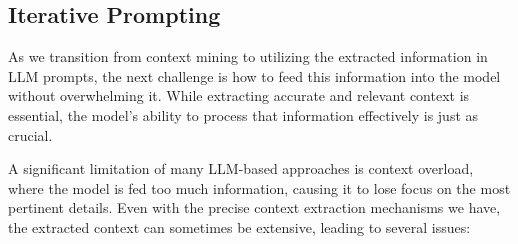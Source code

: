 \subsection{Iterative Prompting}\label{prompting_method}
As we transition from context mining to utilizing the extracted information in LLM prompts, the next challenge is how to feed this information into the model without overwhelming it. While extracting accurate and relevant context is essential, the model's ability to process that information effectively is just as crucial.


\label{challenge_3}
A significant limitation of many LLM-based approaches is context overload, where the model is fed too much information, causing it to lose focus on the most pertinent details.
Even with the precise context extraction mechanisms we have, the extracted context can sometimes be extensive,
leading to several issues:

